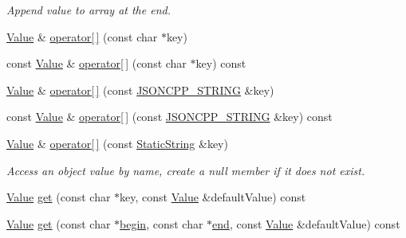 \begin{DoxyCompactItemize}
\begin{DoxyCompactList}\small\item\em Append value to array at the end. \end{DoxyCompactList}\item 
\hyperlink{classJson_1_1Value}{Value} \& \hyperlink{classJson_1_1Value_acb912f4ec40a25ea6eb387730885f3d9_acb912f4ec40a25ea6eb387730885f3d9}{operator\mbox{[}$\,$\mbox{]}} (const char $\ast$key)
\item 
const \hyperlink{classJson_1_1Value}{Value} \& \hyperlink{classJson_1_1Value_a1b0498b7b2a520a68137f682d91abdd5_a1b0498b7b2a520a68137f682d91abdd5}{operator\mbox{[}$\,$\mbox{]}} (const char $\ast$key) const
\item 
\hyperlink{classJson_1_1Value}{Value} \& \hyperlink{classJson_1_1Value_aedd1e152756a4cc8c1ebac0dd7aeeb78_aedd1e152756a4cc8c1ebac0dd7aeeb78}{operator\mbox{[}$\,$\mbox{]}} (const \hyperlink{json_8h_a1e723f95759de062585bc4a8fd3fa4be_a1e723f95759de062585bc4a8fd3fa4be}{J\+S\+O\+N\+C\+P\+P\+\_\+\+S\+T\+R\+I\+NG} \&key)
\item 
const \hyperlink{classJson_1_1Value}{Value} \& \hyperlink{classJson_1_1Value_aba60f69dcd85e935aa85e7a517e03427_aba60f69dcd85e935aa85e7a517e03427}{operator\mbox{[}$\,$\mbox{]}} (const \hyperlink{json_8h_a1e723f95759de062585bc4a8fd3fa4be_a1e723f95759de062585bc4a8fd3fa4be}{J\+S\+O\+N\+C\+P\+P\+\_\+\+S\+T\+R\+I\+NG} \&key) const
\item 
\hyperlink{classJson_1_1Value}{Value} \& \hyperlink{classJson_1_1Value_ac3763d7d315ca65dc188e273722f7955_ac3763d7d315ca65dc188e273722f7955}{operator\mbox{[}$\,$\mbox{]}} (const \hyperlink{classJson_1_1StaticString}{Static\+String} \&key)
\begin{DoxyCompactList}\small\item\em Access an object value by name, create a null member if it does not exist. \end{DoxyCompactList}\item 
\hyperlink{classJson_1_1Value}{Value} \hyperlink{classJson_1_1Value_a57de86629ed23246f14014fb6c44fa67_a57de86629ed23246f14014fb6c44fa67}{get} (const char $\ast$key, const \hyperlink{classJson_1_1Value}{Value} \&default\+Value) const
\item 
\hyperlink{classJson_1_1Value}{Value} \hyperlink{classJson_1_1Value_aa59ed050e87e1d58d93671a38687f36c_aa59ed050e87e1d58d93671a38687f36c}{get} (const char $\ast$\hyperlink{classJson_1_1Value_a015459a3950c198d63a2d3be8f5ae296_a015459a3950c198d63a2d3be8f5ae296}{begin}, const char $\ast$\hyperlink{classJson_1_1Value_a3e443cd0ef24f7e028b175e47ee045e0_a3e443cd0ef24f7e028b175e47ee045e0}{end}, const \hyperlink{classJson_1_1Value}{Value} \&default\+Value) const

\end{DoxyCompactItemize}
